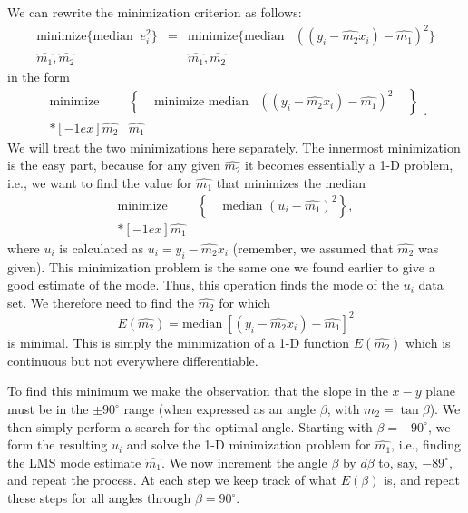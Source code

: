 We can rewrite the minimization criterion as follows:
\begin{equation}
\begin{array}{cccc}
\mbox{minimize} \{ \mbox{median } \ e^2_i \}& = & \mbox{minimize} \{  \mbox{median} & ((y_i - \hat{m_2} x_i) - \hat{m_1})^2\} \\
\hat{m_1}, \hat{m_2} & & \hat{m_1}, \hat{m_2} & \end{array}
\end{equation}	 	
in the form
\begin{equation}
\begin{array}{ccc}
\mbox{minimize} \! \!  & \! \! \! \left \{ \! \! \! \phantom{\displaystyle \frac{\sum }{\ }} \! \!\! \mbox{minimize median} \right. & \! \! \! \left. (( y_i - \hat{m_2}x_i) - \hat{m_1})^2 \! \! \!\phantom{\displaystyle \frac{\sum }{\ }}\! \! \! \right \}\\*[-1ex]
\hat{m_2} & \hat{m_1} & \end{array} .
\end{equation}	 	
We will treat the two minimizations here separately.  The innermost minimization is the easy part, 
because for any given $\hat{m_2}$ it becomes essentially a 1-D problem, i.e., we want to find the value for $\hat{m_1}$ that 
minimizes the median
\begin{equation}
\begin{array}{cc}
\mbox{minimize} \! \! & \! \! \!  \left \{ \phantom{\displaystyle \frac{\sum }{\ }} \! \! \! \! \! \mbox{median } (u_i - \hat{m_1})^2 \right \}, \\*[-1ex]
\hat{m_1} & \end{array}
\end{equation}
where $u_i$ is calculated as $u_i = y_i - \hat{m_2} x_i$ (remember, we assumed that $\hat{m_2}$ was given).  This minimization problem is 
the same one we found earlier to give a good estimate of the mode.  Thus, this operation finds the mode 
of the $u_i$ data set.  We therefore need to find the $\hat{m_2}$ for which
\begin{equation}
E (\hat{m_2}) = \mbox{median} \ [(y_i - \hat{m_2}x_i) - \hat{m_1}]^2
\end{equation}	 
is minimal.  This is simply the minimization of a 1-D function $E(\hat{m_2})$ which is continuous but 
not everywhere differentiable.

To find this minimum we make the observation that the slope in 
the $x-y$ plane must be in the $\pm 90^{\circ}$ range (when expressed as an angle $\beta$, with $m_2 = \tan \beta$).
We then simply perform a search for the optimal angle.  Starting 
with $\beta = -90 ^{\circ}$, we form the resulting $u_i$ and solve the 1-D minimization problem for $\hat{m_1}$, i.e., 
finding the LMS mode estimate $\hat{m_1}$.  We now increment the angle $\beta$ by $d\beta$ to, say, $-89 ^{\circ}$, and 
repeat the process.  At each step we keep track of what $E(\beta)$ is, and repeat these steps for all angles 
through $\beta = 90^{\circ}$.


